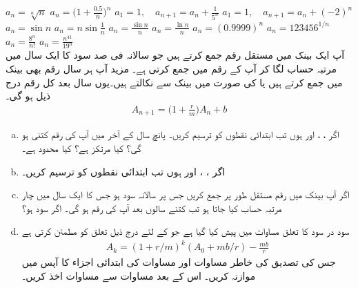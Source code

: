 $a_n=\sqrt[n]{n}$
$a_n=\big(1+\frac{0.5}{n}\big)^n$
$a_1=1,\quad a_{n+1}=a_n+\frac{1}{5^n}$
$a_1=1,\quad a_{n+1}=a_n+(-2)^n$
$a_n=\sin n$
$a_n=n\sin\frac{1}{n}$
$a_n=\frac{\sin n}{n}$
$a_n=\frac{\ln n}{n}$
$a_n=(0.9999)^n$
$a_n=123456^{1/n}$
$a_n=\frac{8^n}{n!}$
$a_n=\frac{n^{41}}{19^n}$
\\
آپ ایک بینک میں مستقل رقم  جمع کرتے ہیں جو سالانہ  فی صد سود کا ایک سال میں  مرتبہ حساب لگا کر  آپ کے رقم میں جمع کرتی ہے۔ مزید آپ ہر سال  رقم بھی بینک میں جمع کرتے ہیں یا  کی صورت میں بینک سے نکالتے ہیں۔یوں  سال بعد کل رقم درج ذیل ہو گی۔
\begin{align}\label{مساوات_تسلسل_سود_در_سود_الف}
A_{n+1}=\big(1+\frac{r}{m}\big)A_n+b
\end{align}
\begin{enumerate}[a.]
\item
اگر ، ،  اور  ہوں تب ابتدائی  نقطوں  کو ترسیم کریں۔ پانچ سال کے آخر میں آپ کی رقم کتنی ہو گی؟ کیا  مرتکز ہے؟ کیا  محدود ہے۔
\item
اگر ، ،  اور  ہوں تب ابتدائی  نقطوں  کو ترسیم کریں۔
\item
اگر آپ بینک میں  رقم مستقل طور پر جمع کریں جس  پر سالانہ  سود ہو جس کا ایک سال میں چار مرتبہ  حساب کیا جاتا ہو تب کتنے سالوں بعد آپ کی رقم  ہو گی۔ اگر سود  ہو؟
\item
سود در سود کا تعلق مساوات  میں پیش کیا گیا ہے جو  کے لئے درج ذیل تعلق کو مطمئن کرتی  ہے
\begin{align}\label{مساوات_تسلسل_سود_در_سود_ب}
A_k=(1+r/m)^k(A_0+mb/r)-\frac{mb}{r}
\end{align}
جس کی تصدیق کی خاطر مساوات  اور مساوات  کی ابتدائی  اجزاء کا آپس میں موازنہ کریں۔ اس کے بعد مساوات  سے مساوات  اخذ کریں۔
\end{enumerate}
